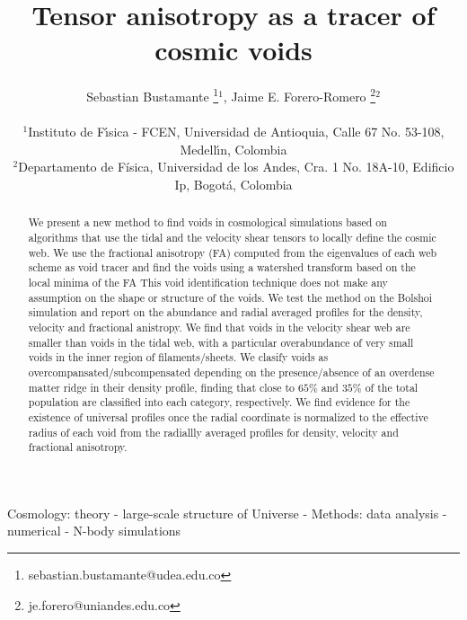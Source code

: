 \documentclass[a4,useAMS,usenatbib,usegraphicx]{mn2e}
\begin{document}
\title{Tensor anisotropy as a tracer of cosmic voids}
\author[S. Bustamante and J.E. Forero-Romero]{
\parbox[t]{\textwidth}{\raggedright 
  Sebastian Bustamante \thanks{sebastian.bustamante@udea.edu.co}$^{1}$,
  Jaime E. Forero-Romero \thanks{je.forero@uniandes.edu.co}$^{2}$ 
}
\vspace*{6pt}\\
$^1$Instituto de F\'{\i}sica - FCEN, Universidad de Antioquia, Calle
67 No. 53-108, Medell\'{\i}n, Colombia\\ 
$^2$Departamento de F\'{i}sica, Universidad de los Andes, Cra. 1
No. 18A-10, Edificio Ip, Bogot\'a, Colombia
}

\maketitle

\begin{abstract}
We present a new method to find voids in cosmological simulations
based on algorithms that use the tidal and the velocity shear tensors
to locally define the cosmic web. 
We use the fractional anisotropy (FA) computed from the eigenvalues
of each web scheme as void tracer and find the voids using a watershed
transform based on the local minima of the FA
This void identification technique does not make any assumption on the
shape or structure of the voids. 
We test the method on the Bolshoi simulation and report on the
abundance and radial averaged profiles for the density, velocity and
fractional anistropy.
We find that voids in the velocity shear web are smaller than voids in
the tidal web, with a particular overabundance of very small voids in
the inner region of filaments/sheets.
We clasify voids as overcompansated/subcompensated depending on the
presence/absence of an overdense matter ridge in their density
profile, finding that close to $65\%$ and $35\%$  of the total
population are classified into each category, respectively.
We find evidence for the existence of universal profiles once the
radial coordinate is normalized to the effective radius of each void
from the radiallly averaged profiles for density, velocity and
fractional anisotropy. 
\end{abstract}

\begin{keywords}
Cosmology: theory - large-scale structure of Universe -
Methods: data analysis - numerical - N-body simulations
\end{keywords}
\end{document}

